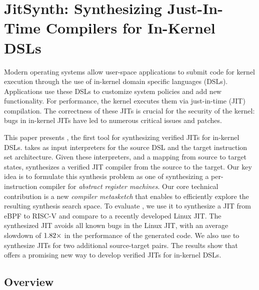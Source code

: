 \chapter{JitSynth: Synthesizing Just-In-Time Compilers for In-Kernel DSLs}
\label{c:jitsynth}
% 


Modern operating systems allow user-space applications to submit code for kernel
execution through the use of in-kernel domain specific languages (DSLs).
Applications use these DSLs to customize system policies and add new
functionality. For performance, the kernel executes them via just-in-time (JIT)
compilation. The correctness of these JITs is crucial for the security of the
kernel: bugs in in-kernel JITs have led to numerous critical issues and
patches.\tighten

\smallskip
This paper presents \jitsynth, the first tool for synthesizing verified JITs for
in-kernel DSLs. \jitsynth takes as input interpreters for the source DSL and the
target instruction set architecture. Given these interpreters, and a mapping
from source to target states, \jitsynth synthesizes a verified JIT compiler from
the source to the target. Our key idea is to formulate this synthesis problem as
one of synthesizing a per-instruction compiler for \emph{abstract register
machines}. Our core technical contribution is a new \emph{compiler metasketch}
that enables \jitsynth to efficiently explore the resulting synthesis search
space. To evaluate \jitsynth, we use it to synthesize a JIT from eBPF to RISC-V
and compare to a recently developed Linux JIT\@. The synthesized JIT avoids all
known bugs in the Linux JIT, with an average slowdown of
$1.82\times$ in the performance of the generated code. We also
use \jitsynth to synthesize JITs for two additional source-target
pairs.  The results show that \jitsynth offers a promising new way
to develop verified JITs for in-kernel DSLs.\tighten


\section{Overview}
















%
%

% 

